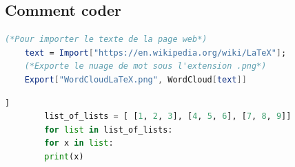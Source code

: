 \documentclass[french, babel]{article}
\begin{document}
\subsection[Sous-section]{Comment coder}
	\lipsum[9-10]
	\begin{lstlisting}[language=Mathematica, caption=Example Mathematica]
	(*Pour importer le texte de la page web*)
	text = Import["https://en.wikipedia.org/wiki/LaTeX"];
	(*Exporte le nuage de mot sous l'extension .png*)
	Export["WordCloudLaTeX.png", WordCloud[text]]
	\end{lstlisting}
	\begin{multicols}{3}
		\lipsum[10-11]
	\end{multicols}
	\begin{lstlisting}[language=Python,caption=Example Python \url{https://www.overleaf.com/learn/latex/code_listing}]]
		list_of_lists = [ [1, 2, 3], [4, 5, 6], [7, 8, 9]]
		for list in list_of_lists:
		for x in list:
		print(x)
	\end{lstlisting}
	\begin{multicols}{3}
		\lipsum[11-12]
	\end{multicols}
	
\end{document}
